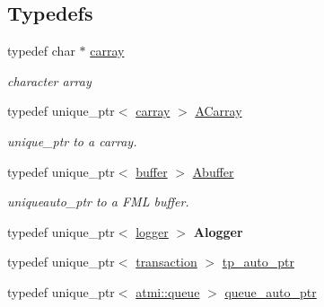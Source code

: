 \subsection*{Typedefs}
\begin{DoxyCompactItemize}
\item 
\hypertarget{group__fml_ga8b57f9a4e2453d8e5d82ac0016e35e87}{typedef char $\ast$ \hyperlink{group__fml_ga8b57f9a4e2453d8e5d82ac0016e35e87}{carray}}\label{group__fml_ga8b57f9a4e2453d8e5d82ac0016e35e87}

\begin{DoxyCompactList}\small\item\em character array \end{DoxyCompactList}\item 
\hypertarget{group__fml_ga374230d2a2355a879f42c829eb2d70ff}{typedef unique\+\_\+ptr$<$ \hyperlink{group__fml_ga8b57f9a4e2453d8e5d82ac0016e35e87}{carray} $>$ \hyperlink{group__fml_ga374230d2a2355a879f42c829eb2d70ff}{A\+Carray}}\label{group__fml_ga374230d2a2355a879f42c829eb2d70ff}

\begin{DoxyCompactList}\small\item\em unique\+\_\+ptr to a carray. \end{DoxyCompactList}\item 
\hypertarget{group__fml_ga268bae34ffaa2c2e72fabbcb54841934}{typedef unique\+\_\+ptr$<$ \hyperlink{classatmi_1_1buffer}{buffer} $>$ \hyperlink{group__fml_ga268bae34ffaa2c2e72fabbcb54841934}{Abuffer}}\label{group__fml_ga268bae34ffaa2c2e72fabbcb54841934}

\begin{DoxyCompactList}\small\item\em uniqueauto\+\_\+ptr to a F\+M\+L buffer. \end{DoxyCompactList}\item 
\hypertarget{namespaceatmi_ab58c19780ca31f0a223e218226fdf7a5}{typedef unique\+\_\+ptr$<$ \hyperlink{classatmi_1_1logger}{logger} $>$ {\bfseries Alogger}}\label{namespaceatmi_ab58c19780ca31f0a223e218226fdf7a5}

\item 
typedef unique\+\_\+ptr$<$ \hyperlink{classatmi_1_1transaction}{transaction} $>$ \hyperlink{group__atmi_ga4a71d76e59908eb5ec5e53269c2742b5}{tp\+\_\+auto\+\_\+ptr}
\item 
typedef unique\+\_\+ptr$<$ \hyperlink{classatmi_1_1queue}{atmi\+::queue} $>$ \hyperlink{group__atmi_ga9eff55eddc901da817f1b087613b18cc}{queue\+\_\+auto\+\_\+ptr}
\end{DoxyCompactItemize}

